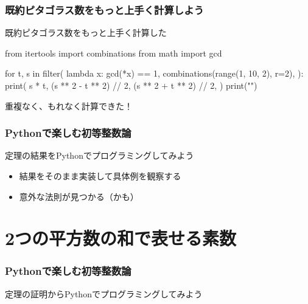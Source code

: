\documentclass[dvipdfmx,11pt,notheorems]{beamer}
\theoremstyle{definition}
\begin{document}
\begin{frame}[fragile]\frametitle{既約ピタゴラス数をもっと上手く計算しよう}

\begin{block}{既約ピタゴラス数をもっと上手く計算した}
\begin{pycode}
from itertools import combinations
from math import gcd

for t, s in filter(
    lambda x: gcd(*x) == 1,
    combinations(range(1, 10, 2), r=2),
):
    print(
        s * t,
        (s ** 2 - t ** 2) // 2,
        (s ** 2 + t ** 2) // 2,
    )
    print("\n")
\end{pycode}
\end{block}

重複なく、もれなく計算できた！

\end{frame}

\begin{frame}\frametitle{Pythonで楽しむ初等整数論}

\begin{block}{定理の結果をPythonでプログラミングしてみよう}
\begin{itemize}
\item 結果をそのまま実装して具体例を観察する
\item 意外な法則が見つかる（かも）
\end{itemize}
\end{block}

\end{frame}

\section{2つの平方数の和で表せる素数}

\begin{frame}\frametitle{Pythonで楽しむ初等整数論}
\huge{定理の証明からPythonでプログラミングしてみよう}
\end{frame}
\end{document}
